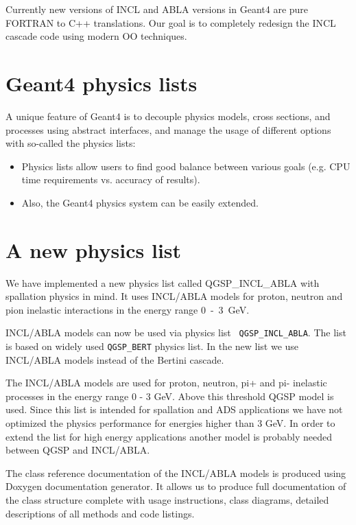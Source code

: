 \documentclass[a4paper]{jpconf}
\begin{document}
Currently new versions of INCL and ABLA versions in Geant4 are pure
FORTRAN to C++ translations. Our goal is to completely redesign the
INCL cascade code using modern OO techniques.

\section{Geant4 physics lists}

A unique feature of Geant4 is to  
decouple physics models, cross sections, and processes
using abstract interfaces, and manage the usage of different options with so-called the physics lists:
\begin{itemize}
\item Physics lists allow users to find good balance between various goals (e.g. CPU
time requirements vs. accuracy of results).
\item Also, the Geant4 physics system can be easily extended.
\end{itemize}



\section{A new physics list}

We have implemented a new physics list called {\sf QGSP\_\-INCL\_ABLA} with
spallation physics in mind. 
It uses INCL/ABLA models for proton,
neutron and pion inelastic interactions in the energy range 0~-~3~GeV.

INCL/ABLA models can now be used via physics list {\tt
QGSP\_INCL\_ABLA}. The list is based on widely used {\tt QGSP\_BERT}
physics list. In the new list we use INCL/ABLA models instead of the
Bertini cascade.

The INCL/ABLA models are used for proton, neutron, pi+ and pi-
inelastic processes in the energy range 0 - 3 GeV. Above this
threshold QGSP model is used. Since this list is intended for
spallation and ADS applications we have not optimized the physics
performance for energies higher than 3 GeV. In order to extend the
list for high energy applications another model is probably needed
between QGSP and INCL/ABLA.

The class reference documentation of the INCL/ABLA models is produced
using Doxygen \cite{doxygen} documentation generator. It allows us to
produce full documentation of the class structure complete with usage
instructions, class diagrams, detailed descriptions of all methods and
code listings.
\end{document}

